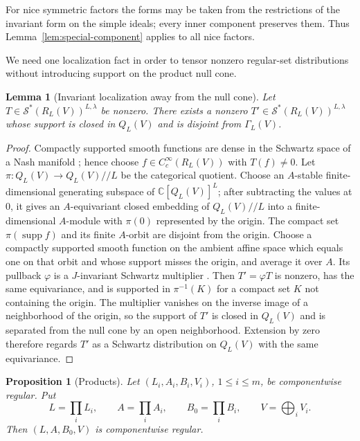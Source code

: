 \documentclass[11pt,reqno]{amsart}
\numberwithin{equation}{section}
\newtheorem{proposition}[theorem]{Proposition}
\newtheorem{lemma}[theorem]{Lemma}
\theoremstyle{definition}
\theoremstyle{remark}
\newcommand{\C}{\mathbb C}
\newcommand{\supp}{\operatorname{supp}}
\newcommand{\cS}{\mathcal S}
\newcommand{\sslash}{/\!\!/}
\begin{document}
For nice symmetric factors the forms may be taken from the restrictions of the
invariant form on the simple ideals; every inner component preserves them.
Thus Lemma~\ref{lem:special-component} applies to all nice factors.

We need one localization fact in order to tensor nonzero regular-set
distributions without introducing support on the product null cone.

\begin{lemma}[Invariant localization away from the null cone]
\label{lem:localize-away}
Let $T\in\cS^*(R_L(V))^{L,\lambda}$ be nonzero.  There exists a nonzero
$T'\in\cS^*(R_L(V))^{L,\lambda}$ whose support is closed in $Q_L(V)$ and is
disjoint from $\Gamma_L(V)$.
\end{lemma}

\begin{proof}
Compactly supported smooth functions are dense in the Schwartz space of a Nash
manifold \cite{AGSchwartz}; hence choose $f\in C_c^\infty(R_L(V))$ with
$T(f)\ne0$.  Let $\pi:Q_L(V)\to Q_L(V)\sslash L$ be the categorical quotient.
Choose an $A$-stable finite-dimensional generating subspace of
$\C[Q_L(V)]^L$; after subtracting the values at $0$, it gives an
$A$-equivariant closed embedding of $Q_L(V)\sslash L$ into a
finite-dimensional $A$-module with $\pi(0)$ represented by the origin.  The compact set $\pi(\supp f)$ and its finite $A$-orbit are
disjoint from the origin.  Choose a compactly supported smooth function on the
ambient affine space which equals one on that orbit and whose support misses
the origin, and average it over $A$.  Its pullback $\varphi$ is a
$J$-invariant Schwartz multiplier \cite{AGSchwartz}.  Then
$T'=\varphi T$ is nonzero, has the same equivariance, and is supported in
$\pi^{-1}(K)$ for a compact set $K$ not containing the origin.  The multiplier
vanishes on the inverse image of a neighborhood of the origin, so the support
of $T'$ is closed in $Q_L(V)$ and is separated from the null cone by an open
neighborhood.  Extension by zero therefore regards $T'$ as a Schwartz
distribution on $Q_L(V)$ with the same equivariance.
\end{proof}

\begin{proposition}[Products]\label{prop:component-product}
Let $(L_i,A_i,B_i,V_i)$, $1\leq i\leq m$, be componentwise regular.  Put
\[
 L=\prod_iL_i,\qquad A=\prod_iA_i,\qquad B_0=\prod_iB_i,
 \qquad V=\bigoplus_iV_i.
\]
Then $(L,A,B_0,V)$ is componentwise regular.
\end{proposition}
\end{document}

